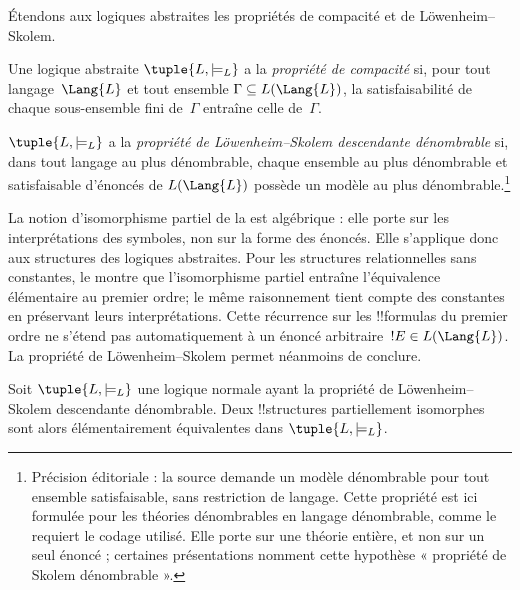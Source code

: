\documentclass[../../../include/open-logic-section]{subfiles}
\begin{document}


Étendons aux logiques abstraites les
propriétés de compacité et de
Löwenheim--Skolem.

\begin{defn}
Une logique abstraite
$\tuple{L,\models_L}$ a la
\emph{propriété de compacité} si,
pour tout langage~$\Lang{L}$ et tout
ensemble $\Gamma\subseteq L(\Lang{L})$,
la satisfaisabilité de chaque
sous-ensemble fini de~$\Gamma$
entraîne celle de~$\Gamma$.
\end{defn}

\begin{defn}
$\tuple{L,\models_L}$ a la
\emph{propriété de Löwenheim--Skolem
descendante dénombrable} si, dans tout
langage au plus dénombrable, chaque
ensemble au plus dénombrable et
satisfaisable d'énoncés de
$L(\Lang{L})$ possède un modèle
au plus dénombrable.\footnote{Précision éditoriale : la source demande un modèle dénombrable pour tout ensemble satisfaisable, sans restriction de langage. Cette propriété est ici formulée pour les théories dénombrables en langage dénombrable, comme le requiert le codage utilisé. Elle porte sur une théorie entière, et non sur un seul énoncé ; certaines présentations nomment cette hypothèse « propriété de Skolem dénombrable ».}
\end{defn}

La notion d'isomorphisme partiel de la
est algébrique : elle porte sur les
interprétations des symboles, non
sur la forme des énoncés. Elle
s'applique donc aux structures
des logiques abstraites. Pour les
structures relationnelles sans
constantes, le
montre que l'isomorphisme partiel
entraîne l'équivalence élémentaire
au premier ordre; le même raisonnement
tient compte des constantes en
préservant leurs interprétations.
Cette récurrence sur les !!{formula}s
du premier ordre ne s'étend pas
automatiquement à un énoncé
arbitraire~$!E\in L(\Lang{L})$.
La propriété de Löwenheim--Skolem
permet néanmoins de conclure.

\begin{thm}
Soit $\tuple{L,\models_L}$ une
logique normale ayant la propriété
de Löwenheim--Skolem descendante
dénombrable. Deux !!{structure}s
partiellement isomorphes sont alors
élémentairement équivalentes dans
$\tuple{L,\models_L}$.
\end{thm}
\end{document}
